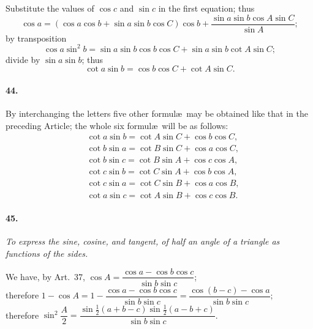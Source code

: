 \documentclass{book}[2004/02/16]
\begin{document}
\begin{mainmatter}
\begin{spacing}{1.3}
Substitute the values of $\cos c$ and $\sin c$ in the first equation;
thus
\[
\cos a = (\cos a \cos b + \sin a \sin b \cos C) \cos b +
\dfrac{\sin a \sin b \cos A \sin C}{\sin A};
\]
by transposition
\[
\cos a \sin^2 b = \sin a \sin b \cos b \cos C + \sin a \sin b \cot A \sin C;
\]
divide by $\sin a \sin b$; thus
\[
\cot a \sin b = \cos b \cos C + \cot A \sin C.
\]

\paragraph{44.} By interchanging the letters five other formul\ae\ may be
obtained like that in the preceding Article; the whole six formul\ae\
will be as follows:
\begin{align*}
&\cot a \sin b = \cot A \sin C + \cos b \cos C, \\
&\cot b \sin a = \cot B \sin C + \cos a \cos C, \\
&\cot b \sin c = \cot B \sin A + \cos c \cos A, \\
&\cot c \sin b = \cot C \sin A + \cos b \cos A, \\
&\cot c \sin a = \cot C \sin B + \cos a \cos B, \\
&\cot a \sin c = \cot A \sin B + \cos c \cos B.
\end{align*}

\paragraph{45.} \textit{To express the sine, cosine, and tangent, of half an angle
of a triangle as functions of the sides.}

We have, by Art.~37, $\cos A = \dfrac{\cos a - \cos b \cos c}{\sin b \sin c}$;\\[1.5ex]
therefore\hfill
$\displaystyle 1 - \cos A = 1 - \dfrac{\cos a - \cos b \cos c}{\sin b \sin c} =
\dfrac{\cos (b - c) - \cos a}{\sin b \sin c};$\hfill\phantom{\text{therefore}}\\[2ex]
therefore\hfill
$\displaystyle \sin^2 \dfrac{A}{2} = \dfrac{\sin \tfrac{1}{2}(a+b-c)\sin\tfrac{1}{2}(a-b+c)}{\sin b \sin c}$.\hfill{}\\


\end{spacing}
\end{mainmatter}
\end{document}
